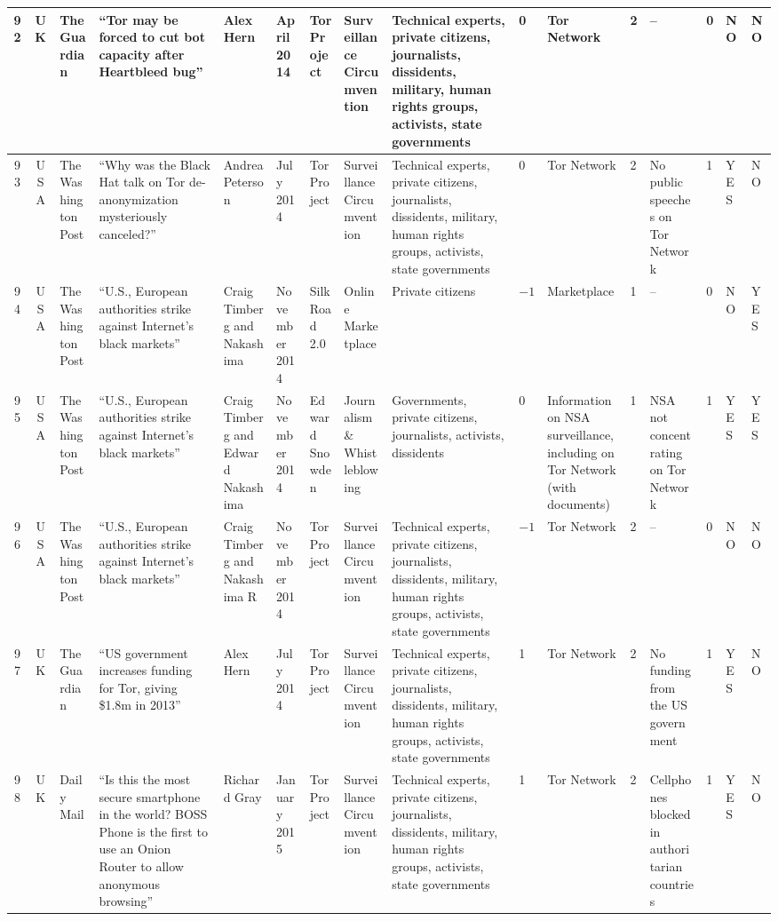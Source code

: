 \begin{landscape}
{\begin{longtable}{|c|c|p{1.2cm}|p{2.5cm}|p{1.4cm}|p{1.2cm}|p{1.4cm}|p{1.2cm}|p{1.8cm}|p{0.4cm}|p{1.8cm}|p{0.4cm}|p{1.5cm}|p{0.4cm}|p{0.6cm}|p{0.6cm}|}
\hline
92 & UK & The Guardian & ``Tor may be forced to cut bot capacity after Heartbleed bug'' & Alex Hern & April 2014 &Tor Project & Surveillance Circumvention & Technical experts, private citizens, journalists, dissidents, military, human rights groups, activists, state governments & 0 & Tor Network & 2 & -- & 0 & NO & NO \\
\hline
93 & USA & The Washington Post & ``Why was the Black Hat talk on Tor de-anonymization mysteriously canceled?'' & Andrea Peterson & July 2014 &Tor Project & Surveillance Circumvention & Technical experts, private citizens, journalists, dissidents, military, human rights groups, activists, state governments & 0 & Tor Network & 2 & No public speeches on Tor Network & 1 & YES & NO \\
\hline
94 & USA & The Washington Post & ``U.S., European authorities strike against Internet's black markets'' & Craig Timberg and Nakashima & November 2014 &Silk Road 2.0 & Online Marketplace & Private citizens & $-1$ & Marketplace & 1 & -- & 0 & NO & YES \\
\hline
95 & USA & The Washington Post & ``U.S., European authorities strike against Internet's black markets'' & Craig Timberg and Edward Nakashima & November 2014 &Edward Snowden & Journalism \& Whistleblowing & Governments, private citizens, journalists, activists, dissidents & 0 & Information on NSA surveillance, including on Tor Network (with documents) & 1 & NSA not concentrating on Tor Network & 1 & YES & YES \\
\hline
96 & USA & The Washington Post & ``U.S., European authorities strike against Internet's black markets'' & Craig Timberg and Nakashima R & November 2014 &Tor Project & Surveillance Circumvention & Technical experts, private citizens, journalists, dissidents, military, human rights groups, activists, state governments & $-1$ & Tor Network & 2 & -- & 0 & NO & NO \\
\hline
97 & UK & The Guardian & ``US government increases funding for Tor, giving \$1.8m in 2013'' & Alex Hern & July 2014 &Tor Project & Surveillance Circumvention & Technical experts, private citizens, journalists, dissidents, military, human rights groups, activists, state governments & 1 & Tor Network & 2 & No funding from the US government & 1 & YES & NO \\
\hline
98 & UK & Daily Mail & ``Is this the most secure smartphone in the world? BOSS Phone is the first to use an Onion Router to allow anonymous browsing'' & Richard Gray & January 2015 &Tor Project & Surveillance Circumvention & Technical experts, private citizens, journalists, dissidents, military, human rights groups, activists, state governments & 1 & Tor Network & 2 & Cellphones blocked in authoritarian countries & 1 & YES & NO \\

\end{longtable}}
\end{landscape}
